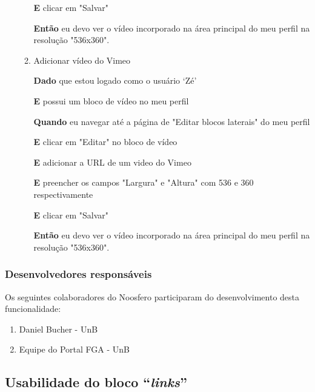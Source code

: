 \begin{enumerate}
\begin{enumerate}
\textbf{E} clicar em "Salvar"

\textbf{Então} eu devo ver o vídeo incorporado na área principal do meu
perfil na resolução "536x360".



\item Adicionar vídeo do Vimeo

\textbf{Dado} que estou logado como o usuário `Zé'

\textbf{E} possui um bloco de vídeo no meu perfil

\textbf{Quando} eu navegar até a página de "Editar blocos laterais" do meu perfil

\textbf{E} clicar em "Editar" no bloco de vídeo

\textbf{E} adicionar a URL de um video do Vimeo

\textbf{E} preencher os campos "Largura" e "Altura" com 536 e 360
respectivamente

\textbf{E} clicar em "Salvar"

\textbf{Então} eu devo ver o vídeo incorporado na área principal do meu
perfil na resolução "536x360".

\end{enumerate}

\end{enumerate}

\subsubsection*{Desenvolvedores responsáveis}

Os seguintes colaboradores do Noosfero participaram do desenvolvimento desta
funcionalidade:

\begin{enumerate}

\item Daniel Bucher - UnB

\item Equipe do Portal FGA - UnB

\end{enumerate}
 
\subsection{Usabilidade do bloco ``\textit{links}''}

